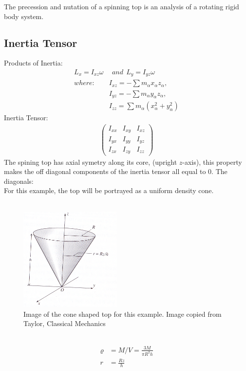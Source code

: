\documentclass[a4paper,12pt]{article}
\begin{document}
The precession and nutation of a spinning top is an analysis of a rotating rigid body system.


\subsection*{Inertia Tensor}


Products of Inertia:
\begin{align*}
L_x=I_{xz}\omega&\ \ and\ \ L_y=I_{yz}\omega\\
where:\ \ &I_{xz}=-\sum m_\alpha x_\alpha z_\alpha,\\
&I_{yz}=-\sum m_\alpha y_\alpha z_\alpha,\\
&I_{zz}=\sum m_\alpha(x_\alpha^2+y_\alpha^2)
\end{align*}
Inertia Tensor:
\begin{align*}
\left( \begin{array}{ccc}
I_{xx} & I_{xy} & I_{xz}\\
I_{yx} & I_{yy} & I_{yz}\\
I_{zx} & I_{zy} & I_{zz} \end{array} \right)
\end{align*}
The spining top has axial symetry along its core, (upright $z$-axis), this property makes the off diagonal components of the inertia tensor all equal to 0.
The diagonals:
\\
For this example, the top will be portrayed as a uniform density cone.\\
\\
\begin{figure}[h!]
\centering
\includegraphics*[width=2in]{Taylor_Cone.png}
\caption{Image of the cone shaped top for this example.  Image copied from Taylor, Classical Mechanics}
\end{figure}
\\
\begin{align*}
\varrho&=M/V=\frac{3M}{\pi R^2h}\\
r&=\frac{Rz}{h}
\end{align*}
\end{document}
